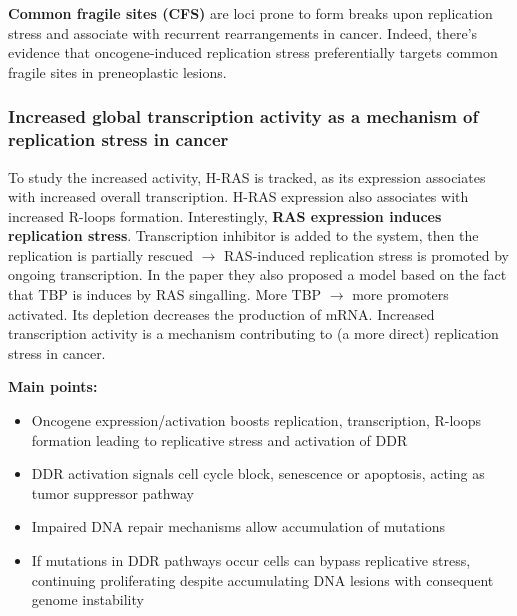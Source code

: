\textbf{Common fragile sites (CFS)} are loci prone to form breaks upon
replication stress and associate with recurrent rearrangements in
cancer. Indeed, there's evidence that oncogene-induced replication
stress preferentially targets common fragile sites in preneoplastic
lesions.

\hypertarget{increased-global-transcription-activity-as-a-mechanism-of-replication-stress-in-cancer}{%
\subsubsection{Increased global transcription activity as a mechanism of
replication stress in
cancer}\label{increased-global-transcription-activity-as-a-mechanism-of-replication-stress-in-cancer}}

To study the increased activity, H-RAS is tracked, as its expression
associates with increased overall transcription. H-RAS expression also
associates with increased R-loops formation. Interestingly, \textbf{RAS
expression induces replication stress}.
Transcription inhibitor is added to the system, then the replication is
partially rescued $\rightarrow$ RAS-induced replication stress is
promoted by ongoing transcription. In the paper they also proposed a
model based on the fact that TBP is induces by RAS singalling. More TBP
$\rightarrow$ more promoters activated. Its depletion decreases the
production of mRNA. Increased transcription activity is a mechanism
contributing to (a more direct) replication stress in cancer.


\textbf{Main points:} 
\begin{itemize}
\tightlist
\item Oncogene expression/activation boosts
replication, transcription, R-loops formation leading to replicative
stress and activation of DDR 
\item DDR activation signals cell cycle block,
senescence or apoptosis, acting as tumor suppressor pathway
\item Impaired
DNA repair mechanisms allow accumulation of mutations
\item If mutations in
DDR pathways occur cells can bypass replicative stress, continuing
proliferating despite accumulating DNA lesions with consequent genome
instability
\end{itemize}


